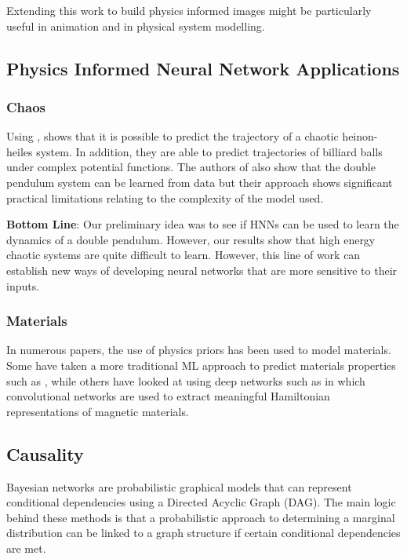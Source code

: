 \documentclass{article}
\begin{document}
Extending this work to build physics informed images might be particularly useful in animation and in physical system modelling.

\subsection{Physics Informed Neural Network Applications}

\subsubsection{Chaos}

Using , \cite{choudhary_physics_2019} shows that it is possible to predict the trajectory of a chaotic heinon-heiles system. In addition, they are able to predict trajectories of billiard balls under complex potential functions. The authors of \cite{cranmer_lagrangian_2020} also show that the double pendulum system can be learned from data but their approach shows significant practical limitations relating to the complexity of the model used.

\textbf{Bottom Line}: Our preliminary idea was to see if HNNs can be used to learn the dynamics of a double pendulum. However, our  results show that high energy chaotic systems are quite difficult to learn. However, this line of work can establish new ways of developing neural networks that are more sensitive to their inputs. 


\subsubsection{Materials}

In numerous papers, \cite{rupp_fast_2012,witkoskie_neural_2005,pukrittayakamee_simultaneous_2009,smith_ani-1_2017,yao_tensormol-01_2018} the use of physics priors has been used to model materials. Some have taken a more traditional ML approach to predict materials properties such as \cite{rupp_fast_2012}, while others have looked at using deep networks such as \cite{wang_machine_2019} in which convolutional networks are used to extract meaningful Hamiltonian representations of magnetic materials.


\subsection{Causality}

Bayesian networks are probabilistic graphical models that can represent conditional dependencies using a Directed Acyclic Graph (DAG). The main logic behind these methods is that a probabilistic approach to determining a marginal distribution can be linked to a graph structure if certain conditional dependencies are met. 
\end{document}
